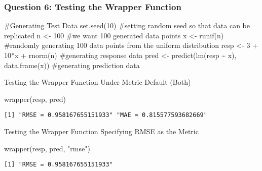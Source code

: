 \documentclass[
  letterpaper,
  DIV=11,
  numbers=noendperiod]{scrartcl}
\newenvironment{Shaded}{\begin{snugshade}}{\end{snugshade}}
\newcommand{\CommentTok}[1]{\textcolor[rgb]{0.37,0.37,0.37}{#1}}
\newcommand{\DecValTok}[1]{\textcolor[rgb]{0.68,0.00,0.00}{#1}}
\newcommand{\FunctionTok}[1]{\textcolor[rgb]{0.28,0.35,0.67}{#1}}
\newcommand{\NormalTok}[1]{\textcolor[rgb]{0.00,0.23,0.31}{#1}}
\newcommand{\OtherTok}[1]{\textcolor[rgb]{0.00,0.23,0.31}{#1}}
\newcommand{\SpecialCharTok}[1]{\textcolor[rgb]{0.37,0.37,0.37}{#1}}
\newcommand{\StringTok}[1]{\textcolor[rgb]{0.13,0.47,0.30}{#1}}
\begin{document}
\subsubsection{Question 6: Testing the Wrapper
Function}\label{question-6-testing-the-wrapper-function}

\begin{Shaded}
\begin{Highlighting}[]
\CommentTok{\#Generating Test Data}
\FunctionTok{set.seed}\NormalTok{(}\DecValTok{10}\NormalTok{) }\CommentTok{\#setting random seed so that data can be replicated}
\NormalTok{n }\OtherTok{\textless{}{-}} \DecValTok{100} \CommentTok{\#we want 100 generated data points}
\NormalTok{x }\OtherTok{\textless{}{-}} \FunctionTok{runif}\NormalTok{(n) }\CommentTok{\#randomly generating 100 data points from the uniform distribution}
\NormalTok{resp }\OtherTok{\textless{}{-}} \DecValTok{3} \SpecialCharTok{+} \DecValTok{10}\SpecialCharTok{*}\NormalTok{x }\SpecialCharTok{+} \FunctionTok{rnorm}\NormalTok{(n) }\CommentTok{\#generating response data}
\NormalTok{pred }\OtherTok{\textless{}{-}} \FunctionTok{predict}\NormalTok{(}\FunctionTok{lm}\NormalTok{(resp }\SpecialCharTok{\textasciitilde{}}\NormalTok{ x), }\FunctionTok{data.frame}\NormalTok{(x)) }\CommentTok{\#generating prediction data}
\end{Highlighting}
\end{Shaded}

Testing the Wrapper Function Under Metric Default (Both)

\begin{Shaded}
\begin{Highlighting}[]
\FunctionTok{wrapper}\NormalTok{(resp, pred)}
\end{Highlighting}
\end{Shaded}

\begin{verbatim}
[1] "RMSE = 0.958167655151933" "MAE = 0.815577593682669" 
\end{verbatim}

Testing the Wrapper Function Specifying RMSE as the Metric

\begin{Shaded}
\begin{Highlighting}[]
\FunctionTok{wrapper}\NormalTok{(resp, pred, }\StringTok{"rmse"}\NormalTok{)}
\end{Highlighting}
\end{Shaded}

\begin{verbatim}
[1] "RMSE = 0.958167655151933"
\end{verbatim}
\end{document}
